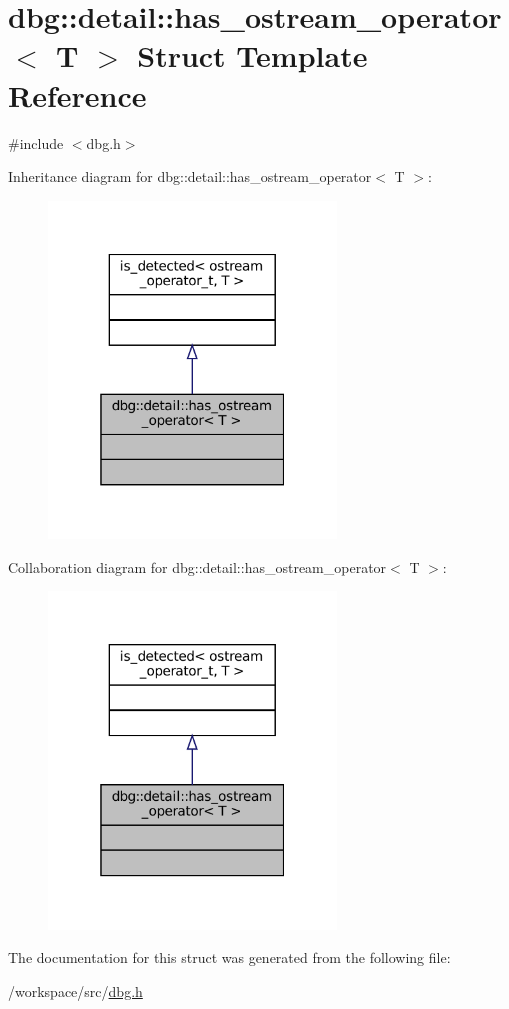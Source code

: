 \hypertarget{structdbg_1_1detail_1_1has__ostream__operator}{}\section{dbg\+:\+:detail\+:\+:has\+\_\+ostream\+\_\+operator$<$ T $>$ Struct Template Reference}
\label{structdbg_1_1detail_1_1has__ostream__operator}


{\ttfamily \#include $<$dbg.\+h$>$}



Inheritance diagram for dbg\+:\+:detail\+:\+:has\+\_\+ostream\+\_\+operator$<$ T $>$\+:
\nopagebreak
\begin{figure}[H]
\begin{center}
\leavevmode
\includegraphics[width=217pt]{structdbg_1_1detail_1_1has__ostream__operator__inherit__graph}
\end{center}
\end{figure}


Collaboration diagram for dbg\+:\+:detail\+:\+:has\+\_\+ostream\+\_\+operator$<$ T $>$\+:
\nopagebreak
\begin{figure}[H]
\begin{center}
\leavevmode
\includegraphics[width=217pt]{structdbg_1_1detail_1_1has__ostream__operator__coll__graph}
\end{center}
\end{figure}


The documentation for this struct was generated from the following file\+:\begin{DoxyCompactItemize}
\item 
/workspace/src/\hyperlink{dbg_8h}{dbg.\+h}\end{DoxyCompactItemize}
